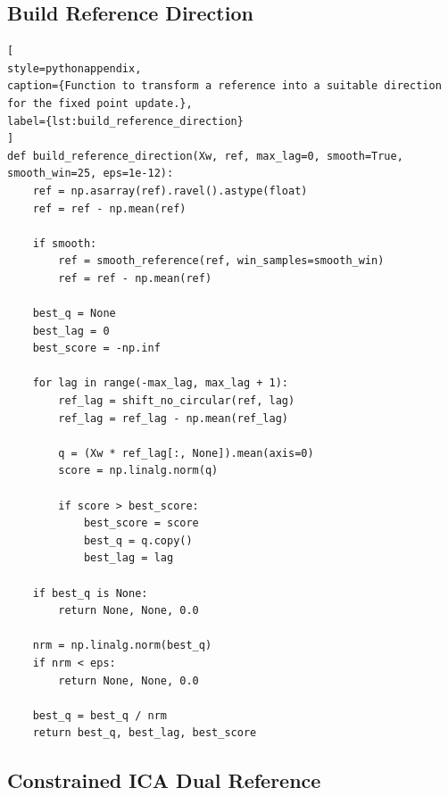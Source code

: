 \subsection{Build Reference Direction}
\label{app:build_reference_direction}

\begin{lstlisting}[
style=pythonappendix,
caption={Function to transform a reference into a suitable direction for the fixed point update.},
label={lst:build_reference_direction}
]
def build_reference_direction(Xw, ref, max_lag=0, smooth=True, smooth_win=25, eps=1e-12):
    ref = np.asarray(ref).ravel().astype(float)
    ref = ref - np.mean(ref)

    if smooth:
        ref = smooth_reference(ref, win_samples=smooth_win)
        ref = ref - np.mean(ref)

    best_q = None
    best_lag = 0
    best_score = -np.inf

    for lag in range(-max_lag, max_lag + 1):
        ref_lag = shift_no_circular(ref, lag)
        ref_lag = ref_lag - np.mean(ref_lag)

        q = (Xw * ref_lag[:, None]).mean(axis=0)
        score = np.linalg.norm(q)

        if score > best_score:
            best_score = score
            best_q = q.copy()
            best_lag = lag

    if best_q is None:
        return None, None, 0.0

    nrm = np.linalg.norm(best_q)
    if nrm < eps:
        return None, None, 0.0

    best_q = best_q / nrm
    return best_q, best_lag, best_score
\end{lstlisting}
\clearpage
\subsection{Constrained ICA Dual Reference}

